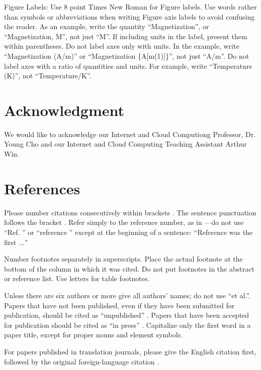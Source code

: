 \documentclass[conference]{IEEEtran}
\begin{document}
Figure Labels: Use 8 point Times New Roman for Figure labels. Use words 
rather than symbols or abbreviations when writing Figure axis labels to 
avoid confusing the reader. As an example, write the quantity 
``Magnetization'', or ``Magnetization, M'', not just ``M''. If including 
units in the label, present them within parentheses. Do not label axes only 
with units. In the example, write ``Magnetization (A/m)'' or ``Magnetization 
\{A[m(1)]\}'', not just ``A/m''. Do not label axes with a ratio of 
quantities and units. For example, write ``Temperature (K)'', not 
``Temperature/K''.

\section*{Acknowledgment}

We would like to acknowledge our Internet and Cloud Computiong Professor, Dr. Young Cho and our Internet and Cloud Computing  Teaching Assistant Arthur Win.

\section*{References}

Please number citations consecutively within brackets \cite{b1}. The 
sentence punctuation follows the bracket \cite{b2}. Refer simply to the reference 
number, as in \cite{b3}---do not use ``Ref. \cite{b3}'' or ``reference \cite{b3}'' except at 
the beginning of a sentence: ``Reference \cite{b3} was the first $\ldots$''

Number footnotes separately in superscripts. Place the actual footnote at 
the bottom of the column in which it was cited. Do not put footnotes in the 
abstract or reference list. Use letters for table footnotes.

Unless there are six authors or more give all authors' names; do not use 
``et al.''. Papers that have not been published, even if they have been 
submitted for publication, should be cited as ``unpublished'' \cite{b4}. Papers 
that have been accepted for publication should be cited as ``in press'' \cite{b5}. 
Capitalize only the first word in a paper title, except for proper nouns and 
element symbols.

For papers published in translation journals, please give the English 
citation first, followed by the original foreign-language citation \cite{b6}.
\end{document}
